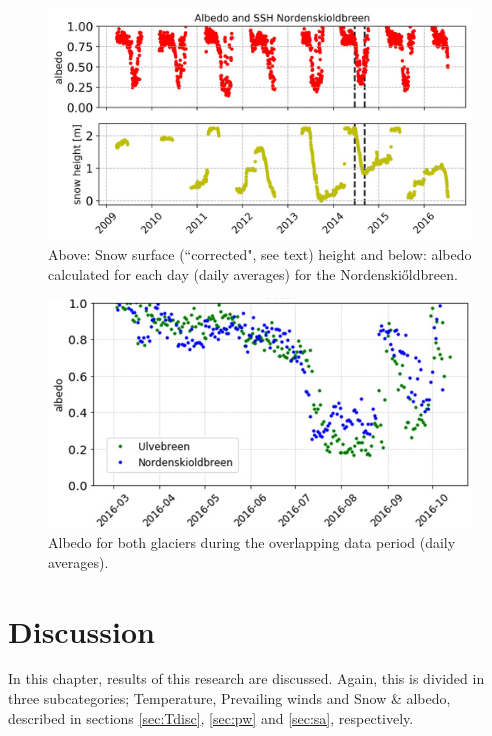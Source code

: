 \documentclass[11pt]{report}
\begin{document}
\begin{figure}[h]
\includegraphics[scale=1, width=1\textwidth]{Picture3.jpg}
\caption{Above: Snow surface (``corrected", see text) height and below: albedo calculated for each day (daily averages) for the Nordenski\H{o}ldbreen.}
\label{fig:S3}
\end{figure}

\begin{figure}[h]
\includegraphics[scale=1, width=1 \textwidth]{albedo.jpg}
\caption{Albedo for both glaciers during the overlapping data period (daily averages).}
\label{fig:albedo}
\end{figure}


\chapter{Discussion} \label{sec:discussion}

In this chapter, results of this research are discussed. Again, this is divided in three subcategories; Temperature, Prevailing winds and Snow \& albedo, described in sections \ref{sec:Tdisc}, \ref{sec:pw} and \ref{sec:sa}, respectively. 
\end{document}

